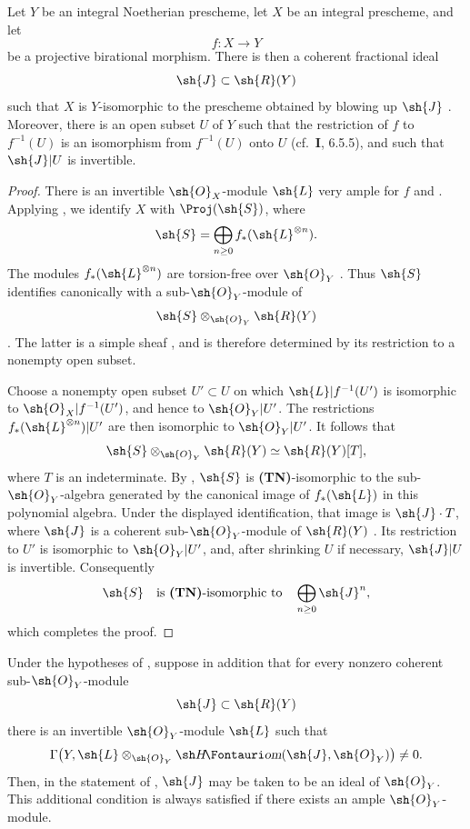 \begin{proposition}[2.3.5]
\label{III.2.3.5}
Let $Y$ be an integral Noetherian prescheme, let $X$ be an integral prescheme, and let
\[
  f:X\longrightarrow Y
\]
be a projective birational morphism.
There is then a coherent fractional ideal
\[
  \sh{J}\subset\sh{R}(Y)
\]
 such that $X$ is $Y$-isomorphic to the prescheme obtained by blowing up $\sh{J}$ .
Moreover, there is an open subset $U$ of $Y$ such that the restriction of $f$ to $f^{-1}(U)$ is an isomorphism from $f^{-1}(U)$ onto $U$ (cf.\ \textbf{I}, 6.5.5), and such that $\sh{J}|U$ is invertible.
\end{proposition}

\begin{proof}
There is an invertible $\sh{O}_X$-module $\sh{L}$ very ample for $f$  and .
Applying , we identify $X$ with $\Proj(\sh{S})$, where
\[
  \sh{S}=\bigoplus_{n\geq0}f_*(\sh{L}^{\otimes n}).
\]
The modules $f_*(\sh{L}^{\otimes n})$ are torsion-free over $\sh{O}_Y$ .
Thus $\sh{S}$ identifies canonically with a sub-$\sh{O}_Y$-module of
\[
  \sh{S}\otimes_{\sh{O}_Y}\sh{R}(Y)
\]
.
The latter is a simple sheaf , and is therefore determined by its restriction to a nonempty open subset.

Choose a nonempty open subset $U'\subset U$ on which $\sh{L}|f^{-1}(U')$ is isomorphic to $\sh{O}_X|f^{-1}(U')$, and hence to $\sh{O}_Y|U'$.
The restrictions $f_*(\sh{L}^{\otimes n})|U'$ are then isomorphic to $\sh{O}_Y|U'$.
It follows that
\[
  \sh{S}\otimes_{\sh{O}_Y}\sh{R}(Y)
  \simeq\sh{R}(Y)[T],
\]
where $T$ is an indeterminate.
By , $\sh{S}$ is \textbf{(TN)}-isomorphic to the sub-$\sh{O}_Y$-algebra generated by the canonical image of $f_*(\sh{L})$ in this polynomial algebra.
Under the displayed identification, that image is $\sh{J}\cdot T$, where $\sh{J}$ is a coherent sub-$\sh{O}_Y$-module of $\sh{R}(Y)$ .
Its restriction to $U'$ is isomorphic to $\sh{O}_Y|U'$, and, after shrinking $U$ if necessary, $\sh{J}|U$ is invertible.
Consequently
\[
  \sh{S}\quad\text{is \textbf{(TN)}-isomorphic to}\quad
  \bigoplus_{n\geq0}\sh{J}^n,
\]
which completes the proof.
\end{proof}

\begin{corollary}[2.3.6]
\label{III.2.3.6}
Under the hypotheses of , suppose in addition that for every nonzero coherent sub-$\sh{O}_Y$-module
\[
  \sh{J}\subset\sh{R}(Y)
\]
there is an invertible $\sh{O}_Y$-module $\sh{L}$ such that
\[
  \Gamma\bigl(Y,\sh{L}\otimes_{\sh{O}_Y}
  \shHom(\sh{J},\sh{O}_Y)\bigr)\neq0.
\]
Then, in the statement of , $\sh{J}$ may be taken to be an ideal of $\sh{O}_Y$.
This additional condition is always satisfied if there exists an ample $\sh{O}_Y$-module.
\end{corollary}

